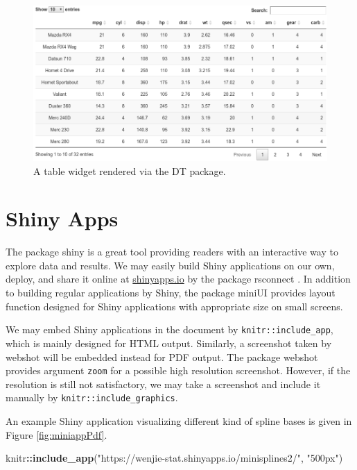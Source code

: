\documentclass[11pt,letterpaper,]{article}
\newenvironment{Shaded}{\begin{snugshade}}{\end{snugshade}}
\newcommand{\KeywordTok}[1]{\textcolor[rgb]{0.13,0.29,0.53}{\textbf{#1}}}
\newcommand{\NormalTok}[1]{#1}
\newcommand{\OperatorTok}[1]{\textcolor[rgb]{0.81,0.36,0.00}{\textbf{#1}}}
\newcommand{\StringTok}[1]{\textcolor[rgb]{0.31,0.60,0.02}{#1}}
\newcommand{\pkg}[1]{{\normalfont\fontseries{b}\selectfont #1}}
\theoremstyle{definition}
\theoremstyle{definition}
\theoremstyle{definition}
\theoremstyle{remark}
\begin{document}
\begin{figure}

{\centering \includegraphics[width=0.9\linewidth]{figs/webshot_mtcars} 

}

\caption{A table widget rendered via the \pkg{DT} package.}\label{fig:dtPdf}
\end{figure}

\hypertarget{sec:shiny}{%
\section{Shiny Apps}\label{sec:shiny}}

The package \pkg{shiny} \citep{chang2017shiny} is a great tool providing
readers with an interactive way to explore data and results. We may
easily build Shiny applications on our own, deploy, and share it online
at \href{https://www.shinyapps.io/}{shinyapps.io} by the package
\pkg{rsconnect} \citep{allaire2016rsconnect}. In addition to building
regular applications by \pkg{Shiny}, the package \pkg{miniUI}
\citep{cheng2016miniUI} provides layout function designed for Shiny
applications with appropriate size on small screens.

We may embed Shiny applications in the document by
\texttt{knitr::include\_app}, which is mainly designed for HTML output.
Similarly, a screenshot taken by \pkg{webshot} will be embedded instead
for PDF output. The package \pkg{webshot} provides argument
\texttt{zoom} for a possible high resolution screenshot. However, if the
resolution is still not satisfactory, we may take a screenshot and
include it manually by \texttt{knitr::include\_graphics}.

An example Shiny application visualizing different kind of spline bases
is given in Figure \ref{fig:miniappPdf}.




\begin{Shaded}
\begin{Highlighting}[]
\NormalTok{knitr}\OperatorTok{::}\KeywordTok{include_app}\NormalTok{(}\StringTok{"https://wenjie-stat.shinyapps.io/minisplines2/"}\NormalTok{, }\StringTok{"500px"}\NormalTok{)}
\end{Highlighting}
\end{Shaded}
\end{document}
